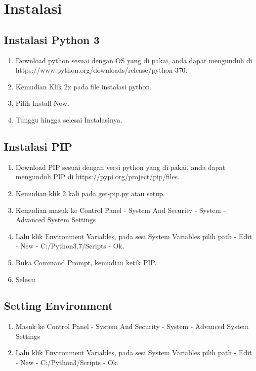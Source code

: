 \documentclass{article}
\begin{document}
\section{Instalasi}
    \subsection{Instalasi Python 3}
        \begin{enumerate}
            \item Download python sesuai dengan OS yang di pakai, anda dapat mengunduh di https://www.python.org/downloads/release/python-370.
            \item Kemudian Klik 2x pada file instalasi python.
            \item Pilih Install Now.
            \item Tunggu hingga selesai Instalasinya.
        \end{enumerate}

\subsection{Instalasi PIP}
    \begin{enumerate} 
        \item Download PIP sesuai dengan versi python yang di pakai, anda dapat mengunduh PIP di https://pypi.org/project/pip/files.
        \item Kemudian klik 2 kali pada get-pip.py atau setup.
        \item Kemudian masuk ke Control Panel - System And Security - System - Advanced System Settings
        \item Lalu klik Environment Variables, pada sesi System Variables pilih path - Edit - New - C:/Python3.7/Scripts - Ok.
        \item Buka Command Prompt, kemudian ketik PIP.
        \item Selesai
    \end{enumerate}
    
\subsection{Setting Environment}
    \begin{enumerate} 
        \item Masuk ke Control Panel - System And Security - System - Advanced System Settings
         \item Lalu klik Environment Variables, pada sesi System Variables pilih path - Edit - New - C:/Python3/Scripts - Ok.
    \end{enumerate}
\end{document}
